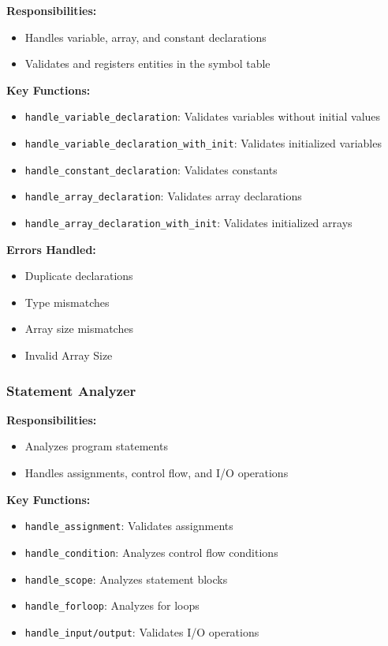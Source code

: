 \documentclass[12pt,a4paper]{article}
\begin{document}
\textbf{Responsibilities:}
\begin{itemize}
	\item Handles variable, array, and constant declarations
	\item Validates and registers entities in the symbol table
\end{itemize}

\textbf{Key Functions:}
\begin{itemize}
	\item \texttt{handle\_variable\_declaration}: Validates variables without initial values
	\item \texttt{handle\_variable\_declaration\_with\_init}: Validates initialized variables
	\item \texttt{handle\_constant\_declaration}: Validates constants
	\item \texttt{handle\_array\_declaration}: Validates array declarations
	\item \texttt{handle\_array\_declaration\_with\_init}: Validates initialized arrays
\end{itemize}

\textbf{Errors Handled:}
\begin{itemize}
	\item Duplicate declarations
	\item Type mismatches
	\item Array size mismatches
	\item Invalid Array Size
\end{itemize}

\subsubsection{Statement Analyzer}

\textbf{Responsibilities:}
\begin{itemize}
	\item Analyzes program statements
	\item Handles assignments, control flow, and I/O operations
\end{itemize}

\textbf{Key Functions:}
\begin{itemize}
	\item \texttt{handle\_assignment}: Validates assignments
	\item \texttt{handle\_condition}: Analyzes control flow conditions
	\item \texttt{handle\_scope}: Analyzes statement blocks
	\item \texttt{handle\_forloop}: Analyzes for loops
	\item \texttt{handle\_input/output}: Validates I/O operations
\end{itemize}
\end{document}
